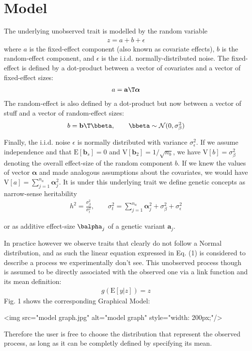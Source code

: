 \section{Model}

The underlying unobserved trait is modelled by the random variable
\begin{align*}
z = a + b + \epsilon \tag{1}
\end{align*}
where $a$ is the fixed-effect component (also known as covariate effects), $b$ is the random-effect component, and $\epsilon$ is the i.i.d. normally-distributed noise. The fixed-effect is defined by a dot-product between a vector of covariates and a vector of fixed-effect sizes:
\begin{align*}
a = \mathbf a\T \boldsymbol\alpha
\end{align*}
The random-effect is also defined by a dot-product but now between a vector of stuff and a vector of random-effect sizes:
\begin{align*}
b = \mathbf b\T \bbeta, \qquad \bbeta \sim \mathcal N(0, \sigma^2_{\beta})
\end{align*}

Finally, the i.i.d. noise $\epsilon$ is normally distributed with variance $\sigma^2_{\epsilon}$. If we assume independence and that $\mathrm E[\mathbf b_s] = 0$ and $\mathrm V[\mathbf b_2]=1/\sqrt{n_b}$, we have $\mathrm V[b] = \sigma^2_{\beta}$ denoting the overall effect-size of the random component $b$. If we knew the values of vector $\boldsymbol\alpha$  and made analogous assumptions about the covariates, we would have $\mathrm V[a]  = \sum_{j=1}^{n_a} \boldsymbol \alpha_j^2$. It is under this underlying trait we define genetic concepts as narrow-sense heritability
\begin{align*}
h^2=\frac{\sigma^2_{\beta}}{\sigma_t^2}, \qquad \sigma_t^2 = \sum_{j=1}^{n_a} \boldsymbol \alpha_j^2 + \sigma^2_{\beta} + \sigma^2_{\epsilon}
\end{align*}

or as additive effect-size $\balpha_j$ of a genetic variant $\mathbf a_j$.

In practice however we observe traits that clearly do not follow a Normal distribution, and as such the linear equation expressed in Eq. (1) is considered to describe a process we experimentally don't see. This unobserved process though is assumed to be directly associated with the observed one via a link function and its mean definition:
\begin{align*}
g(\mathrm E[y|z]) = z
\end{align*}
Fig. 1 shows the corresponding Graphical Model:

<img src="model graph.jpg" alt="model graph" style="width: 200px;"/>

Therefore the user is free to choose the distribution that represent the observed process, as long as it can be completly defined by specifying its mean.
